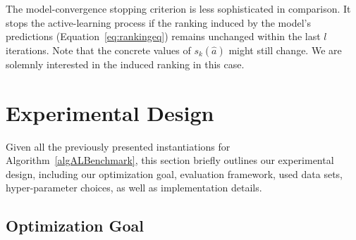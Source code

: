 \documentclass[runningheads]{llncs}
\begin{document}
The model-convergence stopping criterion is less sophisticated in comparison.
It stops the active-learning process if the ranking induced by the model's predictions (Equation~\ref{eq:rankingeq}) remains unchanged within the last $l$ iterations.
Note that the concrete values of $s_k(\hat a)$ might still change.
We are solemnly interested in the induced ranking in this case.


\section{Experimental Design}
\label{sec:exdesign}

Given all the previously presented instantiations for Algorithm~\ref{algALBenchmark}, this section briefly outlines our experimental design, including our optimization goal, evaluation framework, used data sets, hyper-parameter choices, as well as implementation details.

\subsection{Optimization Goal}
\label{sec:goal}
\end{document}

